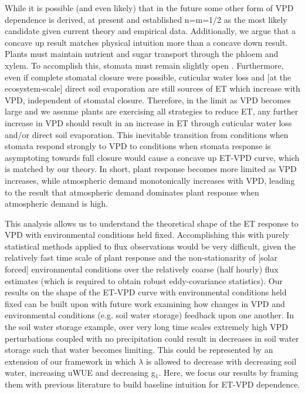 \documentclass[draft]{agujournal2019}
\begin{document}
While it is possible (and even likely) that in the future some other
form of VPD dependence is derived, at present \cite{MEDLYN_2011} and
\cite{Zhou_2014} established n=m=1/2 as the most likely candidate
given current theory and empirical data. Additionally, we argue that a
concave up result matches physical intuition more than a concave down
result. Plants must maintain nutrient and sugar transport through the
phloem and xylem. To accomplish this, stomata must remain slightly
open \cite{De_2013, Nikinmaa_2013, Ryan_2014}. Furthermore, even if
complete stomatal closure were possible, cuticular water loss and [at
the ecosystem-scale] direct soil evaporation are still sources of ET
which increase with VPD, independent of stomatal closure. Therefore,
in the limit as VPD becomes large and we assume plants are exercising
all strategies to reduce ET, any further increase in VPD should result
in an increase in ET through cuticular water loss and/or direct soil
evaporation. This inevitable transition from conditions when stomata
respond strongly to VPD to conditions when stomata response is
asymptoting towards full closure would cause a concave up ET-VPD
curve, which is matched by our theory. In short, plant response
becomes more limited as VPD increases, while atmospheric demand
monotonically increases with VPD, leading to the result that
atmospheric demand dominates plant response when atmospheric demand is
high.

This analysis allows us to understand the theoretical shape of the ET
response to VPD with environmental conditions held
fixed. Accomplishing this with purely statistical methods applied to
flux observations would be very difficult, given the relatively fast
time scale of plant response and the non-stationarity of [solar
forced] environmental conditions over the relatively coarse (half
hourly) flux estimates (which is required to obtain robust
eddy-covariance statistics). Our results on the shape of the ET-VPD
curve with environmental conditions held fixed can be built upon with
future work examining how changes in VPD and environmental conditions
(e.g. soil water storage) feedback upon one another. In the soil water
storage example, over very long time scales extremely high VPD
perturbations coupled with no precipitation could result in decreases
in soil water storage such that water becomes limiting. This could be
represented by an extension of our framework in which $\lambda$ is
allowed to decrease with decreasing soil water, increasing uWUE and
decreasing g$_1$. Here, we focus our results by framing them with
previous literature to build baseline intuition for ET-VPD dependence.
\end{document}
